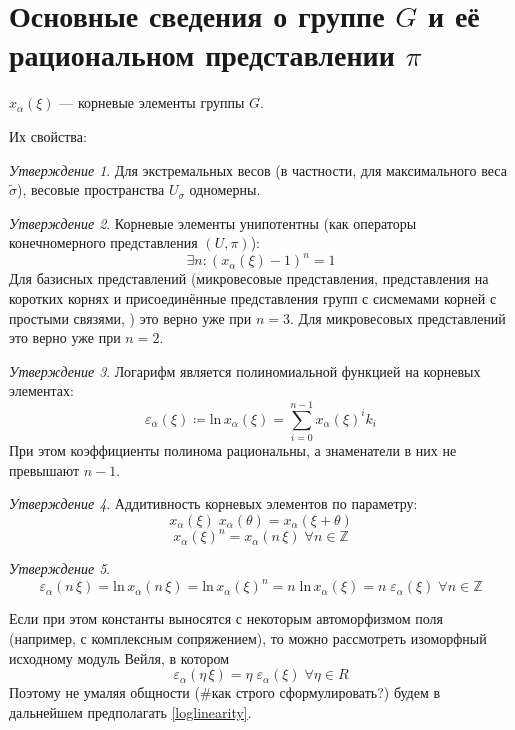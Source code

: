 \documentclass[10pt]{article}
\theoremstyle{remark}
\newtheorem{prop}{Утверждение}
\newcommand{\Z}{\mathbb{Z}}
\begin{document}
\section{Основные сведения о группе $G$ и её рациональном представлении $\pi$}

$x_\alpha(\xi)$ --- корневые элементы группы $G$.

Их свойства:

\begin{prop}
Для экстремальных весов (в частности, для максимального веса $\widetilde\sigma$), весовые пространства $U_\sigma$ одномерны.
\end{prop}

\begin{prop}
Корневые элементы унипотентны (как операторы конечномерного представления $(U,\pi)$):
$$\exists n : (x_\alpha(\xi)-1)^n = 1$$
Для базисных представлений (микровесовые представления, представления на коротких корнях и присоединённые представления групп с сисмемами корней с простыми связями, \cite{Plotkin1998}) это верно уже при $n=3$. Для микровесовых представлений это верно уже при $n=2$.
\end{prop}

\begin{prop}
Логарифм является полиномиальной функцией на корневых элементах:
$$ \varepsilon_\alpha(\xi) \coloneqq \mathrm{ln} \, x_\alpha(\xi) = \sum_{i=0}^{n-1} {x_\alpha(\xi)^i k_i} $$
При этом коэффициенты полинома рациональны, а знаменатели в них не превышают $n-1$.
\end{prop}

\begin{prop} Аддитивность корневых элементов по параметру:
$$x_\alpha(\xi) \; x_\alpha(\theta)  = x_\alpha(\xi+\theta)$$
$$x_\alpha(\xi)^n = x_\alpha(n \, \xi) \; \forall n \in \Z$$
\end{prop}

\begin{prop}
$$ \varepsilon_\alpha(n \, \xi) = \mathrm{ln} \, x_\alpha(n \, \xi) = \mathrm{ln} \, x_\alpha(\xi)^n = n \; \mathrm{ln} \, x_\alpha(\xi) = n \; \varepsilon_\alpha(\xi) \; \forall n \in \Z
$$
\end{prop}

Если при этом константы выносятся с некоторым автоморфизмом поля (например, с комплексным сопряжением), то можно рассмотреть изоморфный исходному модуль Вейля, в котором
\begin{equation} \label{loglinearity}
\varepsilon_\alpha(\eta \, \xi) = \eta \; \varepsilon_\alpha(\xi) \; \forall \eta \in R
\end{equation}
Поэтому не умаляя общности (\#как строго сформулировать?) будем в дальнейшем предполагать \ref{loglinearity}.
\end{document}
